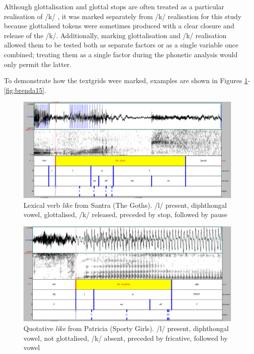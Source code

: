 \noindent Although glottalisation and glottal stops are often treated as a particular realisation of /k/ \citep{lavoie2002}, it was marked separately from /k/ realisation for this study because glottalised tokens were sometimes produced with a clear closure and release of the /k/. Additionally, marking glottalisation and /k/ realisation allowed them to be tested both as separate factors or as a single variable once combined; treating them as a single factor during the phonetic analysis would only permit the latter. 

To demonstrate how the textgrids were marked, examples are shown in Figures \ref{fig:469santra}-\ref{fig:brenda15}.

\begin{figure}[p]
	\centering
		\includegraphics[width=5in]{images/469santra.jpg}
		\caption{Lexical verb \textit{like} from Santra (The Goths). /l/ present, diph\-thongal vowel, glottalised, /k/ released, preceded by stop, followed by pause} 
	\label{fig:469santra}
\end{figure}

\begin{figure}[p]
	\centering
		\includegraphics[width=5in]{images/patricia74.jpg}
	\caption{Quotative \textit{like} from Patricia (Sporty Girls). /l/ present, diph\-thongal vowel, not glottalised, /k/ absent, preceded by fricative, followed by vowel}
	\label{fig:patricia74}
\end{figure}

